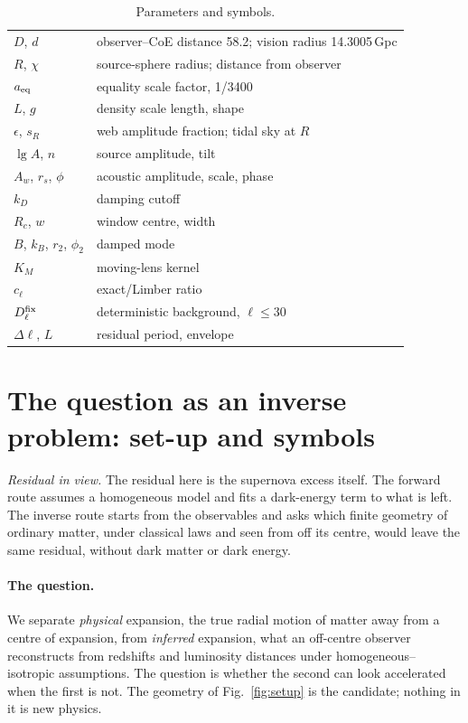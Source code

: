 \documentclass[10pt,twocolumn]{article}
\begin{document}
\begin{table}[tb]\centering\small\caption{Parameters and symbols.}\label{tab:par}\begin{tabular}{@{}p{}p{}@{}}\toprule
$D$, $d$ & observer--CoE distance 58.2; vision radius 14.3005\,Gpc\\
$R$, $\chi$ & source-sphere radius; distance from observer\\
$a_{\rm eq}$ & equality scale factor, 1/3400\\
$L$, $g$ & density scale length, shape\\
$\epsilon$, $s_R$ & web amplitude fraction; tidal sky at $R$\\
$\lg A$, $n$ & source amplitude, tilt\\
$A_w$, $r_s$, $\phi$ & acoustic amplitude, scale, phase\\
$k_D$ & damping cutoff\\
$R_c$, $w$ & window centre, width\\
$B$, $k_B$, $r_2$, $\phi_2$ & damped mode\\
$K_M$ & moving-lens kernel\\
$c_\ell$ & exact/Limber ratio\\
$D^{\rm fix}_\ell$ & deterministic background, $\ell\le30$\\
$\Delta\ell$, $L$ & residual period, envelope\\\bottomrule
\end{tabular}\end{table}
\section{The question as an inverse problem: set-up and symbols}\label{sec:setup}
\noindent\emph{Residual in view.} The residual here is the supernova excess itself. The forward route assumes a homogeneous model and fits a dark-energy term to what is left. The inverse route starts from the observables and asks which finite geometry of ordinary matter, under classical laws and seen from off its centre, would leave the same residual, without dark matter or dark energy.

\paragraph{The question.} We separate \emph{physical} expansion, the true radial motion of matter away from a centre of expansion, from \emph{inferred} expansion, what an off-centre observer reconstructs from redshifts and luminosity distances under homogeneous--isotropic assumptions. The question is whether the second can look accelerated when the first is not. The geometry of Fig.~\ref{fig:setup} is the candidate; nothing in it is new physics.
\end{document}
